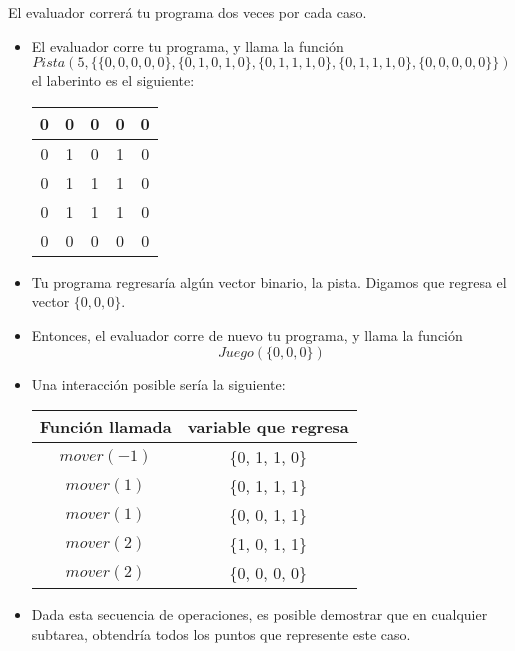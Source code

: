 \documentclass[12pt]{scrartcl}
\begin{document}
    El evaluador correrá tu programa dos veces por cada caso.


        \begin{itemize}
            \item El evaluador corre tu programa, y llama la función
            $$Pista(5, \{\{0, 0, 0, 0, 0\}, \{0, 1, 0, 1, 0\}, \{0, 1, 1, 1, 0\}, \{0, 1, 1, 1, 0\}, \{0, 0, 0, 0, 0\} \})$$
            el laberinto es el siguiente:
            \begin{center}
                \begin{tabular}{|c|c|c|c|c|}
                    \hline
                     0 & 0 & 0 & 0 & 0 \\
                     \hline
                     0 & 1 & 0 & 1 & 0 \\
                     \hline
                     0 & 1 & 1 & 1 & 0 \\
                     \hline
                     0 & 1 & 1 & 1 & 0 \\
                     \hline
                     0 & 0 & 0 & 0 & 0 \\
                     \hline
                \end{tabular}
            \end{center}
        \item Tu programa regresaría algún vector binario, la pista. Digamos que regresa el vector $\{0, 0, 0\}$.

        \item Entonces, el evaluador corre de nuevo tu programa, y llama la función 
        $$Juego(\{0, 0, 0\})$$
        \item Una interacción posible sería la siguiente:
        \begin{center}
            \begin{tabular}{|c|c|}
                \hline
                 Función llamada & variable que regresa \\
                 \hline
                 $mover(-1)$ & \{0, 1, 1, 0\} \\
                 \hline
                 $mover(1)$ & \{0, 1, 1, 1\} \\
                 \hline
                 $mover(1)$ & \{0, 0, 1, 1\} \\
                 \hline
                 $mover(2)$ & \{1, 0, 1, 1\} \\
                 \hline
                 $mover(2)$ & \{0, 0, 0, 0\} \\
                 \hline
                 \hline
                 
            \end{tabular}
            
        \end{center}
        \item Dada esta secuencia de operaciones, es posible demostrar que en cualquier subtarea, obtendría todos los puntos que represente este caso. 
        \end{itemize}
\end{document}

